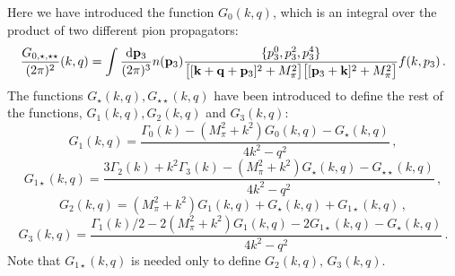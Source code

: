 Here we have introduced the function $G_0(k,q)$, which is an integral over the product of two different pion propagators:
\begin{equation}
\frac{G_{0,\star,\star\star}}{(2\pi)^2}(k,q)=
\int \frac{{\mathrm d}{\bf p}_3}{(2\pi)^3}n({\bf p}_3)
\frac{\{p_3^0,p_3^2,p_3^4\}}{\big[[{\bf k}+{\bf q}+{\bf p}_3]^2+M_\pi^2\big]\big[[{\bf p}_3+{\bf k}]^2+M_\pi^2\big]}f(k,p_3)\,.
\label{eq:G_0} 
\end{equation}
The functions $G_{\star}(k,q), G_{\star\star}(k,q)$ have been introduced to define the rest of the functions, $G_1(k,q), G_2(k,q)$ and $G_3(k,q)$:
\begin{equation}
\label{eq:G_1}
G_1(k,q)=\frac{\Gamma_0(k)-(M_\pi^2+k^2)G_0(k,q)-G_\star(k,q)}{4k^2-q^2}\,,
\end{equation}
\begin{equation}
\label{eq:G_1star}
G_{1\star}(k,q)=\frac{3\Gamma_2(k)+k^2\Gamma_3(k)-(M_\pi^2+k^2)G_\star(k,q)-G_{\star\star}(k,q)}{4k^2-q^2}\,,
\end{equation}
\begin{equation}
\label{eq:G_2}
G_2(k,q)=(M_\pi^2+k^2)G_1(k,q)+G_\star(k,q)+G_{1\star}(k,q)\,,
\end{equation}
\begin{equation}
\label{eq:G_3}
G_3(k,q)=\frac{\Gamma_1(k)/2-2(M_\pi^2+k^2)G_1(k,q)-2G_{1\star}(k,q)-G_\star(k,q)}{4k^2-q^2}\,.
\end{equation}
Note that $G_{1\star}(k,q)$ is needed only to define $G_2(k,q),\,G_3(k,q)$.\\

